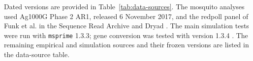 Dated versions are provided in Table~\ref{tab:data-sources}. The mosquito analyses used Ag1000G Phase 2 AR1, released 6 November 2017, and the redpoll panel of Funk et al. in the Sequence Read Archive and Dryad \citep{malariagen_phase2_ar1_2017,ag1000g2020,funk2021redpoll}. The main simulation tests were run with \texttt{msprime} 1.3.3; gene conversion was tested with version 1.3.4 \citep{baumdicker2022msprime}. The remaining empirical and simulation sources and their frozen versions are listed in the data-source table.
